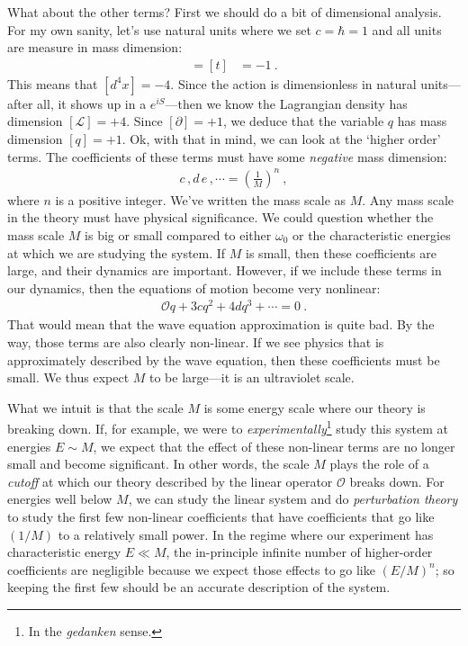 What about the other terms? First we should do a bit of dimensional analysis. For my own sanity, let's use natural units where we set $c=\hbar =1$ and all units are measure in mass dimension:
\begin{align}
	[x] = [t] &= -1 \ .
\end{align}
This means that $[d^4x] = -4$. Since the action is dimensionless in natural units---after all, it shows up in a $e^{iS}$---then we know the Lagrangian density has dimension $[\mathcal L] = +4$. Since $[\partial]=+1$, we deduce that the variable $q$ has mass dimension $[q]=+1$. Ok, with that in mind, we can look at the `higher order' terms. The coefficients of these terms must have some \emph{negative} mass dimension:
\begin{align}
	c\, , d\, e \, , \cdots = \left(\frac{1}{M}\right)^n \ ,
\end{align}
where $n$ is a positive integer. We've written the mass scale as $M$. Any mass scale in the theory must have physical significance. We could question whether the mass scale $M$ is big or small compared to either $\omega_0$ or the characteristic energies at which we are studying the system. If $M$ is small, then these coefficients are large, and their dynamics are important. However, if we include these terms in our dynamics, then the equations of motion become very nonlinear:
\begin{align}
	\mathcal O q + 3cq^2 + 4d q^3 + \cdots = 0 \ .
\end{align}
That would mean that the wave equation approximation is quite bad. By the way, those terms are also clearly non-linear. If we see physics that is approximately described by the wave equation, then these coefficients must be small. We thus expect $M$ to be large---it is an ultraviolet scale. 

What we intuit is that the scale $M$ is some energy scale where our theory is breaking down. If, for example, we were to \emph{experimentally}\footnote{In the \emph{gedanken} sense.} study this system at energies $E\sim M$, we expect that the effect of these non-linear terms are no longer small and become significant. In other words, the scale $M$ plays the role of a \emph{cutoff} at which our theory described by the linear operator $\mathcal O$ breaks down. For energies well below $M$, we can study the linear system and do \emph{perturbation theory} to study the first few non-linear coefficients that have coefficients that go like $(1/M)$ to a relatively small power. In the regime where our experiment has characteristic energy $E\ll M$, the in-principle infinite number of higher-order coefficients are negligible because we expect those effects to go like $(E/M)^n$; so keeping the first few should be an accurate description of the system.

